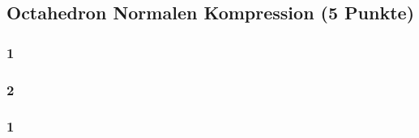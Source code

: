\newif\ifvimbug
\vimbugfalse

\ifvimbug

\fi


\subsection{Octahedron Normalen Kompression (5 Punkte)}
\subsubsection{1}

\subsubsection{2}

\subsubsection{1}


